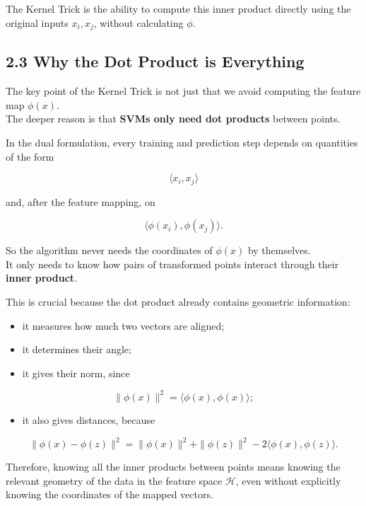 \documentclass[
  italian,
  11pt,
]{article}
\providecommand{\tightlist}{%
  \setlength{\itemsep}{0pt}\setlength{\parskip}{0pt}}
\begin{document}
The Kernel Trick is the ability to compute this inner product directly
using the original inputs \(x_i, x_j\), without calculating \(\phi\).

\subsection{2.3 Why the Dot Product is
Everything}\label{why-the-dot-product-is-everything}

The key point of the Kernel Trick is not just that we avoid computing
the feature map \(\phi(x)\).\\
The deeper reason is that \textbf{SVMs only need dot products} between
points.

In the dual formulation, every training and prediction step depends on
quantities of the form

\[
\langle x_i, x_j \rangle
\]

and, after the feature mapping, on

\[
\langle \phi(x_i), \phi(x_j) \rangle.
\]

So the algorithm never needs the coordinates of \(\phi(x)\) by
themselves.\\
It only needs to know how pairs of transformed points interact through
their \textbf{inner product}.

This is crucial because the dot product already contains geometric
information:

\begin{itemize}
\tightlist
\item
  it measures how much two vectors are aligned;
\item
  it determines their angle;
\item
  it gives their norm, since
\end{itemize}

\[
\|\phi(x)\|^2 = \langle \phi(x), \phi(x) \rangle;
\]

\begin{itemize}
\tightlist
\item
  it also gives distances, because
\end{itemize}

\[
\|\phi(x)-\phi(z)\|^2
=
\|\phi(x)\|^2+\|\phi(z)\|^2-2\langle \phi(x),\phi(z)\rangle.
\]

Therefore, knowing all the inner products between points means knowing
the relevant geometry of the data in the feature space \(\mathcal H\),
even without explicitly knowing the coordinates of the mapped vectors.
\end{document}
